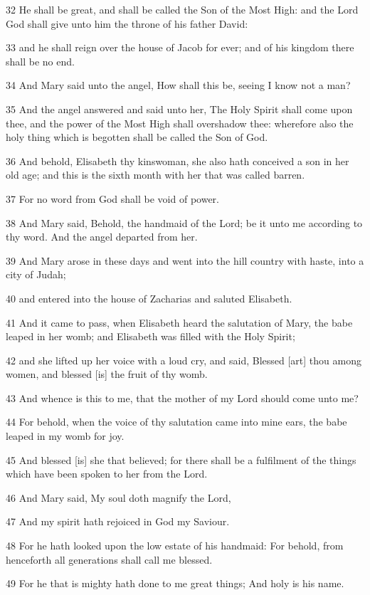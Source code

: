 \par 32 He shall be great, and shall be called the Son of the Most High: and the Lord God shall give unto him the throne of his father David:
\par 33 and he shall reign over the house of Jacob for ever; and of his kingdom there shall be no end.
\par 34 And Mary said unto the angel, How shall this be, seeing I know not a man?
\par 35 And the angel answered and said unto her, The Holy Spirit shall come upon thee, and the power of the Most High shall overshadow thee: wherefore also the holy thing which is begotten shall be called the Son of God.
\par 36 And behold, Elisabeth thy kinswoman, she also hath conceived a son in her old age; and this is the sixth month with her that was called barren.
\par 37 For no word from God shall be void of power.
\par 38 And Mary said, Behold, the handmaid of the Lord; be it unto me according to thy word. And the angel departed from her.
\par 39 And Mary arose in these days and went into the hill country with haste, into a city of Judah;
\par 40 and entered into the house of Zacharias and saluted Elisabeth.
\par 41 And it came to pass, when Elisabeth heard the salutation of Mary, the babe leaped in her womb; and Elisabeth was filled with the Holy Spirit;
\par 42 and she lifted up her voice with a loud cry, and said, Blessed [art] thou among women, and blessed [is] the fruit of thy womb.
\par 43 And whence is this to me, that the mother of my Lord should come unto me?
\par 44 For behold, when the voice of thy salutation came into mine ears, the babe leaped in my womb for joy.
\par 45 And blessed [is] she that believed; for there shall be a fulfilment of the things which have been spoken to her from the Lord.
\par 46 And Mary said, My soul doth magnify the Lord,
\par 47 And my spirit hath rejoiced in God my Saviour.
\par 48 For he hath looked upon the low estate of his handmaid: For behold, from henceforth all generations shall call me blessed.
\par 49 For he that is mighty hath done to me great things; And holy is his name.
